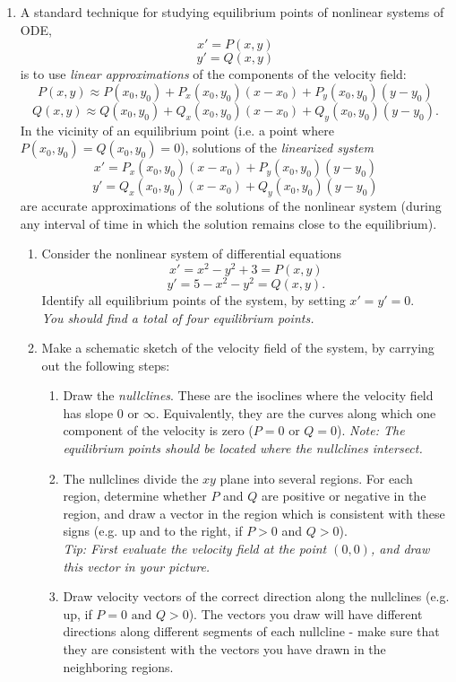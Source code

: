 \documentclass[10pt,psamsfonts,reqno,oneside,letterpaper]{amsart}
\begin{document}
\begin{enumerate}[I]
	\item A standard technique for studying equilibrium points of nonlinear systems of ODE,
	\[ x' = P(x,y) \]
	\[ y' = Q(x,y) \]
	is to use \emph{linear approximations} of the components of the velocity field:
	\[  P(x,y) \approx P(x_0,y_0) + P_x(x_0,y_0) (x-x_0) + P_y(x_0,y_0) (y-y_0) \]
	\[  Q(x,y) \approx Q(x_0,y_0) + Q_x(x_0,y_0)  (x-x_0) + Q_y(x_0,y_0) (y-y_0). \]
	In the vicinity of an equilibrium point (i.e. a point where $P(x_0,y_0) = Q(x_0,y_0) = 0$), solutions of the \emph{linearized system} 
	\[ x' = P_x(x_0,y_0) (x-x_0) + P_y(x_0,y_0) (y-y_0)  \]
	\[ y' = Q_x(x_0,y_0)  (x-x_0) + Q_y(x_0,y_0) (y-y_0)\]
	are accurate approximations of the solutions of the nonlinear system (during any interval of time in which the solution remains close to the equilibrium).
	\begin{enumerate}
		\item Consider the nonlinear system of differential equations 
		\[ x'  = x^2 - y^2 + 3 = P(x,y) \]
		\[ y'  = 5 - x^2 - y^2  = Q(x,y). \]
		Identify all equilibrium points of the system, by setting $x' = y' = 0$. \\
		\textit{You should find a total of four equilibrium points.}
		\item Make a schematic sketch of the velocity field of the system, by carrying out the following steps:
		\begin{enumerate}
			\item Draw the \textit{nullclines}.  These are the isoclines where the velocity field has slope $0$ or $\infty$.  Equivalently, they are the curves along which one component of the velocity is zero ($P = 0$ or $Q = 0$). 
			\textit{Note: The equilibrium points should be located where the nullclines intersect.}
		\item The nullclines divide the $xy$ plane into several regions.  For each region, determine whether $P$ and $Q$ are positive or negative in the region, and draw a vector in the region which is consistent with these signs (e.g. up and to the right, if $P>0$ and $Q>0$). \\
			\textit{Tip: First evaluate the velocity field at the point $(0,0)$, and draw this vector in your picture.}
		\item Draw velocity vectors of the correct direction along the nullclines (e.g. up, if $P=0\textrm{ and }Q>0$).  The vectors you draw will have different directions along different segments of each nullcline - make sure that they are consistent with the vectors you have drawn in the neighboring regions.
		\end{enumerate}
		

\end{enumerate}
\end{enumerate}
\end{document}
